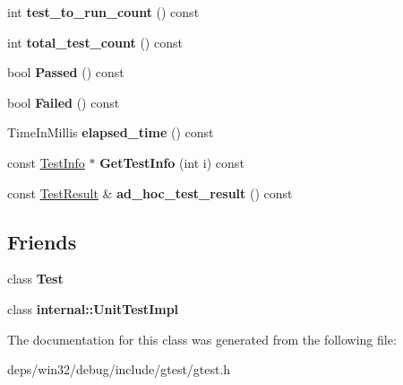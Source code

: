 \begin{DoxyCompactItemize}
\item 
\hypertarget{classtesting_1_1_test_case_a47de0cf87858370388275c9d995f1ff4}{}int {\bfseries test\+\_\+to\+\_\+run\+\_\+count} () const \label{classtesting_1_1_test_case_a47de0cf87858370388275c9d995f1ff4}

\item 
\hypertarget{classtesting_1_1_test_case_ac7b2ed22822735b7b9ae2740162332c9}{}int {\bfseries total\+\_\+test\+\_\+count} () const \label{classtesting_1_1_test_case_ac7b2ed22822735b7b9ae2740162332c9}

\item 
\hypertarget{classtesting_1_1_test_case_ad093a04334d7eb8d707a7f1a321b040f}{}bool {\bfseries Passed} () const \label{classtesting_1_1_test_case_ad093a04334d7eb8d707a7f1a321b040f}

\item 
\hypertarget{classtesting_1_1_test_case_a5c0922d310f860e78cca7e215f2fa0e4}{}bool {\bfseries Failed} () const \label{classtesting_1_1_test_case_a5c0922d310f860e78cca7e215f2fa0e4}

\item 
\hypertarget{classtesting_1_1_test_case_a80f163d2826ba8586fffb41e8d686727}{}Time\+In\+Millis {\bfseries elapsed\+\_\+time} () const \label{classtesting_1_1_test_case_a80f163d2826ba8586fffb41e8d686727}

\item 
\hypertarget{classtesting_1_1_test_case_a17dfa2a9fde64f5add3615e9426e81e1}{}const \hyperlink{classtesting_1_1_test_info}{Test\+Info} $\ast$ {\bfseries Get\+Test\+Info} (int i) const \label{classtesting_1_1_test_case_a17dfa2a9fde64f5add3615e9426e81e1}

\item 
\hypertarget{classtesting_1_1_test_case_a3993481a8f0c2253653b5e1ec5934432}{}const \hyperlink{classtesting_1_1_test_result}{Test\+Result} \& {\bfseries ad\+\_\+hoc\+\_\+test\+\_\+result} () const \label{classtesting_1_1_test_case_a3993481a8f0c2253653b5e1ec5934432}

\end{DoxyCompactItemize}
\subsection*{Friends}
\begin{DoxyCompactItemize}
\item 
\hypertarget{classtesting_1_1_test_case_ab085d1bf4cff8b1045750706b11f8662}{}class {\bfseries Test}\label{classtesting_1_1_test_case_ab085d1bf4cff8b1045750706b11f8662}

\item 
\hypertarget{classtesting_1_1_test_case_aa684cc13a8f91b00c0c9ce41ec7474eb}{}class {\bfseries internal\+::\+Unit\+Test\+Impl}\label{classtesting_1_1_test_case_aa684cc13a8f91b00c0c9ce41ec7474eb}

\end{DoxyCompactItemize}


The documentation for this class was generated from the following file\+:\begin{DoxyCompactItemize}
\item 
deps/win32/debug/include/gtest/gtest.\+h\end{DoxyCompactItemize}
